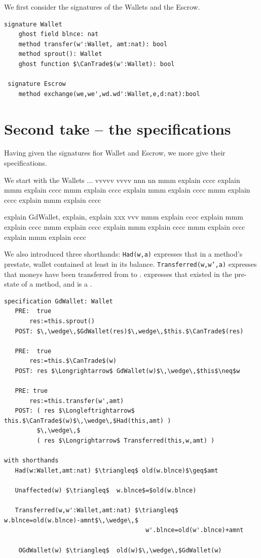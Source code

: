 \documentclass[acmsmall,review,anonymous,screen]{acmart}\settopmatter{printfolios=true,printacmref=false}
\newcommand{\CanTrade}{\mbox{\texttt{Trades}}}
\begin{document}
 We first consider the signatures of the Wallets and the Escrow.
 
\begin{lstlisting}[mathescape=true, language=Chainmail, frame=lines]
signature Wallet
    ghost field blnce: nat
    method transfer(w':Wallet, amt:nat): bool 
    method sprout(): Wallet
    ghost function $\CanTrade$(w':Wallet): bool
 
 signature Escrow
    method exchange(we,we',wd.wd':Wallet,e,d:nat):bool         
\end{lstlisting}

\section{Second take -- the specifications}

Having given the signatures fior Wallet and Escrow, we more give their specifications.

We start with the Wallets ... vvvvv vvvv
nnn nn mmm explain cccc explain  mmm explain cccc  mmm explain cccc explain  mmm explain cccc  mmm explain cccc explain  mmm explain cccc 

explain GdWallet, explain, explain xxx vvv mmm explain cccc explain  mmm explain cccc mmm explain cccc explain  mmm explain cccc mmm explain cccc explain  mmm explain cccc 

We also introduced three shorthands: \texttt{Had(w,a)} expresses that in a method's prestate,
wallet   contained at least  in its balance.
 \texttt{Transferred(w,w',a)} expresses that  moneys have been transferred  from  to .
  expresses that  existed in the pre-state of a method, and is a .
 
\begin{lstlisting}[mathescape=true, language=Chainmail, frame=lines]
specification GdWallet: Wallet
   PRE:  true
       res:=this.sprout()
   POST: $\,\wedge\,$GdWallet(res)$\,wedge\,$this.$\CanTrade$(res)
      
   PRE:  true
       res:=this.$\CanTrade$(w)
   POST: res $\Longrightarrow$ GdWallet(w)$\,\wedge\,$this$\neq$w        
    
   PRE: true
       res:=this.transfer(w',amt)
   POST: ( res $\Longleftrightarrow$ this.$\CanTrade$(w)$\,\wedge\,$Had(this,amt) ) 
         $\,\wedge\,$         
         ( res $\Longrightarrow$ Transferred(this,w,amt) )  
           
with shorthands
   Had(w:Wallet,amt:nat) $\triangleq$ old(w.blnce)$\geq$amt
         
   Unaffected(w) $\triangleq$  w.blnce$=$old(w.blnce)    
   
   Transferred(w,w':Wallet,amt:nat) $\triangleq$  w.blnce=old(w.blnce)-amnt$\,\wedge\,$
                                       w'.blnce=old(w'.blnce)+amnt  
                                       
    OGdWallet(w) $\triangleq$  old(w)$\,\wedge\,$GdWallet(w)                                
\end{lstlisting}
\end{document}
